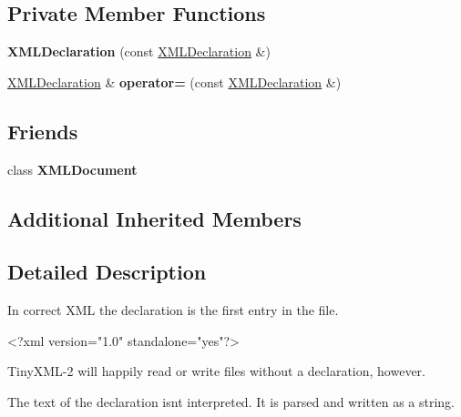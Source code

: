 \subsection*{Private Member Functions}
\begin{DoxyCompactItemize}
\item 
{\bfseries X\+M\+L\+Declaration} (const \hyperlink{classtinyxml2_1_1XMLDeclaration}{X\+M\+L\+Declaration} \&)\hypertarget{classtinyxml2_1_1XMLDeclaration_a5229cc0b31f034f93289af27ec3e2836}{}\label{classtinyxml2_1_1XMLDeclaration_a5229cc0b31f034f93289af27ec3e2836}

\item 
\hyperlink{classtinyxml2_1_1XMLDeclaration}{X\+M\+L\+Declaration} \& {\bfseries operator=} (const \hyperlink{classtinyxml2_1_1XMLDeclaration}{X\+M\+L\+Declaration} \&)\hypertarget{classtinyxml2_1_1XMLDeclaration_a79eb518c2c2b1b99a122a5d5a308b7ee}{}\label{classtinyxml2_1_1XMLDeclaration_a79eb518c2c2b1b99a122a5d5a308b7ee}

\end{DoxyCompactItemize}
\subsection*{Friends}
\begin{DoxyCompactItemize}
\item 
class {\bfseries X\+M\+L\+Document}\hypertarget{classtinyxml2_1_1XMLDeclaration_a4eee3bda60c60a30e4e8cd4ea91c4c6e}{}\label{classtinyxml2_1_1XMLDeclaration_a4eee3bda60c60a30e4e8cd4ea91c4c6e}

\end{DoxyCompactItemize}
\subsection*{Additional Inherited Members}


\subsection{Detailed Description}
In correct X\+ML the declaration is the first entry in the file. \begin{DoxyVerb}    <?xml version="1.0" standalone="yes"?>
\end{DoxyVerb}


Tiny\+X\+M\+L-\/2 will happily read or write files without a declaration, however.

The text of the declaration isn\textquotesingle{}t interpreted. It is parsed and written as a string. 

